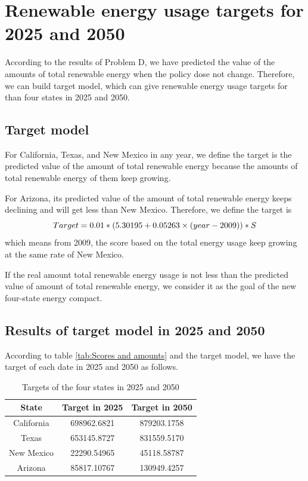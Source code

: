 \documentclass[a4paper,11pt]{article}
\begin{document}
\section{Renewable energy usage targets for 2025 and 2050}
\par According to the results of Problem D, we have predicted the value of the amounts of total renewable energy when the policy dose not change. Therefore, we can build target model, which can give renewable energy usage targets for than four states in 2025 and 2050.
\subsection{Target model}
\par For California, Texas, and New Mexico in any year, we define the target is the predicted value of the amount of total renewable energy because the amounts of total renewable energy of them keep growing.
\par For Arizona, its predicted value of the amount of total renewable energy keeps declining and will get less than New Mexico. Therefore, we define the target is
\begin{equation}
    \centering
    Target=0.01*(5.30195+0.05263 \times (year-2009))*S
\end{equation}
which means from 2009, the score based on the total energy usage keep growing at the same rate of New Mexico.
\par If the real amount total renewable energy usage is not less than the predicted value of amount of total renewable energy, we consider it as the goal of the new four-state energy compact.
\subsection{Results of target model in 2025 and 2050}
\par According to table \ref{tab:Scores and amounts} and the target model, we have the target of each date in 2025 and 2050 as follows.
\begin{table}[H]
    \centering 
    \begin{tabular}{|c|c|c|}
\hline
State & Target in 2025 & Target in 2050\\
\hline
California & 698962.6821 & 879203.1758 \\
\hline
Texas & 653145.8727 & 831559.5170 \\
\hline
New Mexico & 22290.54965 & 45118.58787 \\
\hline
Arizona & 85817.10767 & 130949.4257 \\
\hline
\end{tabular}
\caption{Targets of the four states in 2025 and 2050}
\end{table}
\end{document}
